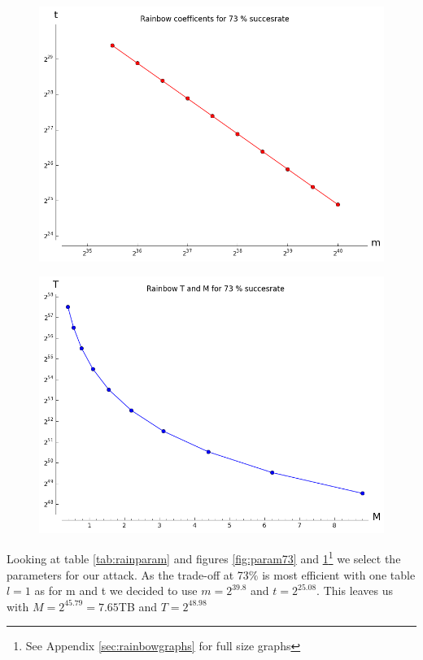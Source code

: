 \begin{figure}[H]
  \centering
  \begin{minipage}{.5\textwidth}
    \centering
    \includegraphics[scale=0.3]{figures/RainbowCoef73.png}
    \label{fig:param73}
  \end{minipage}%
  \begin{minipage}{.5\textwidth}
    \centering
    \includegraphics[scale=0.3]{figures/RainbowTime73.png}
    \label{fig:time73}
  \end{minipage}
\end{figure}
Looking at table \ref{tab:rainparam} and figures \ref{fig:param73}
and \ref{fig:time73}\footnote{See Appendix \ref{sec:rainbowgraphs} for
  full size graphs} we select the parameters for our attack. As the
trade-off at 73$\%$ is most efficient with one table $l=1$ as for m
and t we decided to use $m=2^{39.8}$ and $t=2^{25.08}$. This leaves us
with $M = 2^{45.79} = 7.65$TB and $T = 2^{48.98}$ 

